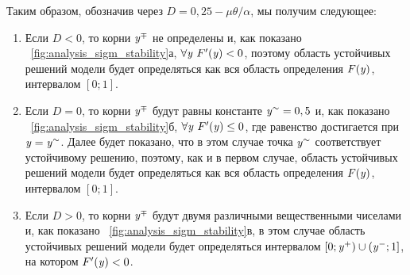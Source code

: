 Таким образом, обозначив через $D = 0,25 - \mu \theta / \alpha$, мы получим следующее:
\begin{enumerate}[wide]
    \item Если $D < 0$, то корни $\mathit{y}^{\mp}$ не определены и, как показано \onfigure~\ref{fig:analysis_sigm_stability}а, $\forall\mathit{y}\ F^{\prime}(\mathit{y}) < 0$, поэтому область устойчивых решений модели будет определяться как вся область определения $F(\mathit{y})$, \ie интервалом $\left[0;1\right]$.
    \item Если $D = 0$, то корни $\mathit{y}^{\mp}$ будут равны константе $\mathit{y}^{\sim} = 0,5$ и, как показано \onfigure~\ref{fig:analysis_sigm_stability}б, $\forall\mathit{y}\ F^{\prime}(\mathit{y}) \le 0$, где равенство достигается при $\mathit{y} = \mathit{y}^{\sim}$. Далее будет показано, что в этом случае точка $\mathit{y}^{\sim}$ соответствует устойчивому решению, поэтому, как и в первом случае, область устойчивых решений модели будет определяться как вся область определения $F(\mathit{y})$, \ie интервалом $\left[0;1\right]$.
    \item Если $D > 0$, то корни $\mathit{y}^{\mp}$ будут двумя различными вещественными чиселами и, как показано \onfigure~\ref{fig:analysis_sigm_stability}в, в этом случае область устойчивых решений модели будет определяться интервалом $\left[0; \mathit{y}^{+}\right) \cup \left(\mathit{y}^{-}; 1\right]$, на котором $F^{\prime}(\mathit{y}) < 0$.
\end{enumerate}

